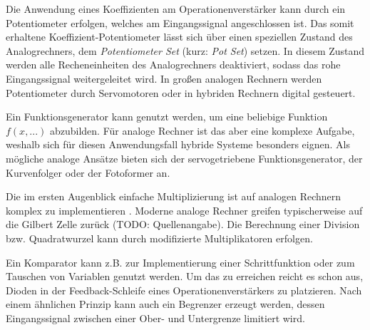 Die Anwendung eines Koeffizienten am Operationenverstärker kann durch ein Potentiometer erfolgen, welches am Eingangssignal angeschlossen ist. Das somit erhaltene Koeffizient-Potentiometer lässt sich über einen speziellen Zustand des Analogrechners, dem \textit{Potentiometer Set} (kurz: \textit{Pot Set}) setzen. In diesem Zustand werden alle Recheneinheiten des Analogrechners deaktiviert, sodass das rohe Eingangssignal weitergeleitet wird. In großen analogen Rechnern werden Potentiometer durch Servomotoren oder in hybriden Rechnern digital gesteuert. \cite[vgl. S. 92 ff.]{Ulmann2022}

Ein Funktionsgenerator kann genutzt werden, um eine beliebige Funktion \(f(x,...)\) abzubilden. Für analoge Rechner ist das aber eine komplexe Aufgabe, weshalb sich für diesen Anwendungsfall hybride Systeme besonders eignen. Als mögliche analoge Ansätze bieten sich der servogetriebene Funktionsgenerator, der Kurvenfolger oder der Fotoformer an. \cite[vgl. S. 97 ff.]{Ulmann2022}

Die im ersten Augenblick einfache Multiplizierung ist auf analogen Rechnern komplex zu implementieren \cite[vgl. S. 105]{Ulmann2022}. Moderne analoge Rechner greifen typischerweise auf die Gilbert Zelle zurück (TODO: Quellenangabe). Die Berechnung einer Division bzw. Quadratwurzel kann durch modifizierte Multiplikatoren erfolgen. \cite[S. 114 f.]{Ulmann2022}

Ein Komparator kann z.B. zur Implementierung einer Schrittfunktion oder zum Tauschen von Variablen genutzt werden. Um das zu erreichen reicht es schon aus, Dioden in der Feedback-Schleife eines Operationenverstärkers zu platzieren. Nach einem ähnlichen Prinzip kann auch ein Begrenzer erzeugt werden, dessen Eingangssignal zwischen einer Ober- und Untergrenze limitiert wird. \cite[S. 116]{Ulmann2022}
